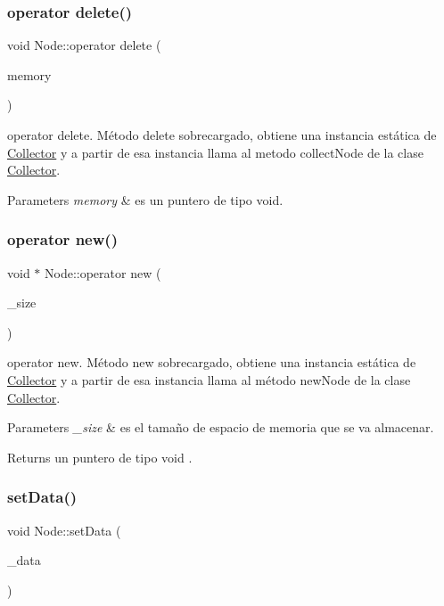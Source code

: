 \subsubsection{\texorpdfstring{operator delete()}{operator delete()}}
{\footnotesize\ttfamily void Node\+::operator delete (\begin{DoxyParamCaption}\item[{void $\ast$}]{memory }\end{DoxyParamCaption})}

operator delete. Método delete sobrecargado, obtiene una instancia estática de \hyperlink{classCollector}{Collector} y a partir de esa instancia llama al metodo collect\+Node de la clase \hyperlink{classCollector}{Collector}. 
\begin{DoxyParams}{Parameters}
{\em memory} & es un puntero de tipo void. \\
\hline
\end{DoxyParams}
\mbox{\label{classNode_af4e2b7adb121ee5eb5e2c38579e13cc7}} 
\subsubsection{\texorpdfstring{operator new()}{operator new()}}
{\footnotesize\ttfamily void $\ast$ Node\+::operator new (\begin{DoxyParamCaption}\item[{size\+\_\+t}]{\+\_\+size }\end{DoxyParamCaption})}

operator new. Método new sobrecargado, obtiene una instancia estática de \hyperlink{classCollector}{Collector} y a partir de esa instancia llama al método new\+Node de la clase \hyperlink{classCollector}{Collector}. 
\begin{DoxyParams}{Parameters}
{\em \+\_\+size} & es el tamaño de espacio de memoria que se va almacenar. \\
\hline
\end{DoxyParams}
\begin{DoxyReturn}{Returns}
un puntero de tipo void . 
\end{DoxyReturn}
\mbox{\label{classNode_a5d4e30d05e75fb3f2c2e26a0d93f5e6c}} 
\subsubsection{\texorpdfstring{set\+Data()}{setData()}}
{\footnotesize\ttfamily void Node\+::set\+Data (\begin{DoxyParamCaption}\item[{int}]{\+\_\+data }\end{DoxyParamCaption})}

